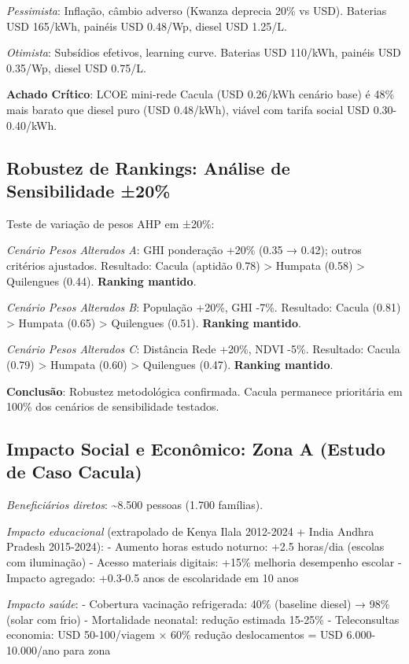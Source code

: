 \documentclass[12pt, a4paper]{article}
\begin{document}
\textit{Pessimista}: Inflação, câmbio adverso (Kwanza deprecia 20\% vs USD). Baterias USD 165/kWh, painéis USD 0.48/Wp, diesel USD 1.25/L.

\textit{Otimista}: Subsídios efetivos, learning curve. Baterias USD 110/kWh, painéis USD 0.35/Wp, diesel USD 0.75/L.

\textbf{Achado Crítico}: LCOE mini-rede Cacula (USD 0.26/kWh cenário base) é 48\% mais barato que diesel puro (USD 0.48/kWh), viável com tarifa social USD 0.30-0.40/kWh.

\subsection{Robustez de Rankings: Análise de Sensibilidade ±20\%}

Teste de variação de pesos AHP em ±20\%:

\textit{Cenário Pesos Alterados A}: GHI ponderação +20\% (0.35 → 0.42); outros critérios ajustados.
Resultado: Cacula (aptidão 0.78) > Humpata (0.58) > Quilengues (0.44). \textbf{Ranking mantido}.

\textit{Cenário Pesos Alterados B}: População +20\%, GHI -7\%.
Resultado: Cacula (0.81) > Humpata (0.65) > Quilengues (0.51). \textbf{Ranking mantido}.

\textit{Cenário Pesos Alterados C}: Distância Rede +20\%, NDVI -5\%.
Resultado: Cacula (0.79) > Humpata (0.60) > Quilengues (0.47). \textbf{Ranking mantido}.

\textbf{Conclusão}: Robustez metodológica confirmada. Cacula permanece prioritária em 100\% dos cenários de sensibilidade testados.

\subsection{Impacto Social e Econômico: Zona A (Estudo de Caso Cacula)}

\textit{Beneficiários diretos}: \textasciitilde{}8.500 pessoas (1.700 famílias).

\textit{Impacto educacional} (extrapolado de Kenya Ilala 2012-2024 + India Andhra Pradesh 2015-2024):
- Aumento horas estudo noturno: +2.5 horas/dia (escolas com iluminação)
- Acesso materiais digitais: +15\% melhoria desempenho escolar
- Impacto agregado: +0.3-0.5 anos de escolaridade em 10 anos

\textit{Impacto saúde}:
- Cobertura vacinação refrigerada: 40\% (baseline diesel) → 98\% (solar com frio)
- Mortalidade neonatal: redução estimada 15-25\%
- Teleconsultas economia: USD 50-100/viagem × 60\% redução deslocamentos = USD 6.000-10.000/ano para zona
\end{document}
